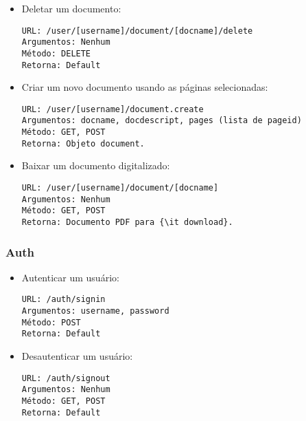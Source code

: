 \begin{itemize}
\item Deletar um documento: 
\begin{verbatim}
URL: /user/[username]/document/[docname]/delete
Argumentos: Nenhum
Método: DELETE
Retorna: Default 
\end{verbatim}

\item Criar um novo documento usando as páginas selecionadas:
\begin{verbatim}
URL: /user/[username]/document.create
Argumentos: docname, docdescript, pages (lista de pageid)
Método: GET, POST
Retorna: Objeto document.
\end{verbatim}

\item Baixar um documento digitalizado:
\begin{verbatim}
URL: /user/[username]/document/[docname]
Argumentos: Nenhum
Método: GET, POST
Retorna: Documento PDF para {\it download}.
\end{verbatim}

\end{itemize}

\subsubsection{Auth}

\begin{itemize}

\item Autenticar um usuário:
\begin{verbatim}
URL: /auth/signin
Argumentos: username, password
Método: POST
Retorna: Default
\end{verbatim}

\item Desautenticar um usuário:
\begin{verbatim}
URL: /auth/signout
Argumentos: Nenhum
Método: GET, POST
Retorna: Default
\end{verbatim} 

\end{itemize}
